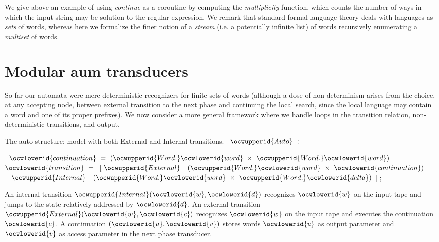 \documentclass[12pt]{article}
\begin{document}
We give above an example of using {\sl continue} as a coroutine by computing 
the {\sl multiplicity} function, which counts the number of ways in which 
the input string may be solution to the regular expression. We remark that 
standard formal language theory deals with languages as {\sl sets} of words,
whereas here we formalize the finer notion of a {\sl stream} (i.e. a 
potentially infinite list) of words recursively enumerating a {\sl multiset}
of words. 



\section{Modular aum transducers}

So far our automata were mere deterministic recognizers for finite sets of words
(although a dose of non-determinism arises from the choice, at any accepting node,
between external transition to the next phase and continuing the local search, since
the local language may contain a word and one of its proper prefixes). 
We now consider a more general framework where we handle loops in the transition 
relation, non-deterministic transitions, and output.

\label{../ML/aumt.mli:0}%
The auto structure: model with both External and Internal transitions. 
\ocweol
\label{../ML/aumt.mli:695}%
\medskip
\ocwbegincode{}\ocwindent{0.00em}
~$\ocwupperid{Auto}~:~$\medskip

\label{../ML/aumt.mli:714}%
\ocwindent{0.00em}
~$\ocwlowerid{continuation}~=~(\ocwupperid{Word.}\ocwlowerid{word}~\times{}~\ocwupperid{Word.}\ocwlowerid{word})$\ocweol
\ocwindent{0.00em}
~$\ocwlowerid{transition}~=~$\ocweol
\ocwindent{1.00em}
$[~\ocwupperid{External}~$~$(\ocwupperid{Word.}\ocwlowerid{word}~\times{}~\ocwlowerid{continuation})$\ocweol
\ocwindent{1.00em}
$\mid{}~\ocwupperid{Internal}~$~$(\ocwupperid{Word.}\ocwlowerid{word}~\times{}~\ocwupperid{Word.}\ocwlowerid{delta})$\ocweol
\ocwindent{1.00em}
$]$\ocweol
\ocwindent{0.00em}
;\medskip

\ocwendcode{}\ocwindent{0.00em}
An internal transition \ocwbegindcode{}$\ocwupperid{Internal}(\ocwlowerid{w},\ocwlowerid{d})$\ocwenddcode{} recognizes \ocwbegindcode{}$\ocwlowerid{w}$\ocwenddcode{} on the input tape
   and jumps to the state relatively addressed by \ocwbegindcode{}$\ocwlowerid{d}$\ocwenddcode{}.
   An external transition \ocwbegindcode{}$\ocwupperid{External}(\ocwlowerid{w},\ocwlowerid{c})$\ocwenddcode{} recognizes \ocwbegindcode{}$\ocwlowerid{w}$\ocwenddcode{} on the input tape
   and executes the continuation \ocwbegindcode{}$\ocwlowerid{c}$\ocwenddcode{}. 
   A continuation \ocwbegindcode{}$(\ocwlowerid{u},\ocwlowerid{v})$\ocwenddcode{} stores words \ocwbegindcode{}$\ocwlowerid{u}$\ocwenddcode{} as output parameter 
   and \ocwbegindcode{}$\ocwlowerid{v}$\ocwenddcode{} as access parameter in the next phase transducer. 
\end{document}
